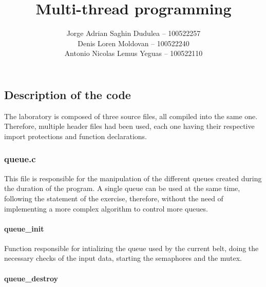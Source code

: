 \documentclass[es]{uc3mreport}
\author{
          Jorge Adrian Saghin Dudulea -- 100522257
      \\
          Denis Loren Moldovan -- 100522240
      \\
          Antonio Nicolas Lemus Yeguas -- 100522110
      }
\title{Multi-thread programming}
\begin{document}
    \makecover

    \tableofcontents

    \begin{report}

      \part{Description of the code}

      \setcounter{section}{0}

      \setcounter{subsection}{0}

      \setcounter{subsubsection}{0}

      The laboratory is composed of three source files, all compiled
      into the same one. Therefore, multiple header files had been used,
      each one having their respective import protections and function
      declarations.

      \section{queue.c}

      \setcounter{subsection}{0}

      \setcounter{subsubsection}{0}

      This file is responsible for the manipulation of the different
      queues created during the duration of the program. A single queue
      can be used at the same time, following the statement of the
      exercise, therefore, without the need of implementing a more
      complex algorithm to control more queues.

      \subsection{queue\_init}

      \setcounter{subsubsection}{0}

      Function responsible for intializing the queue used by the current
      belt, doing the necessary checks of the input data, starting the
      semaphores and the mutex.

      \subsection{queue\_destroy}

      \setcounter{subsubsection}{0}


\end{report}
\end{document}
